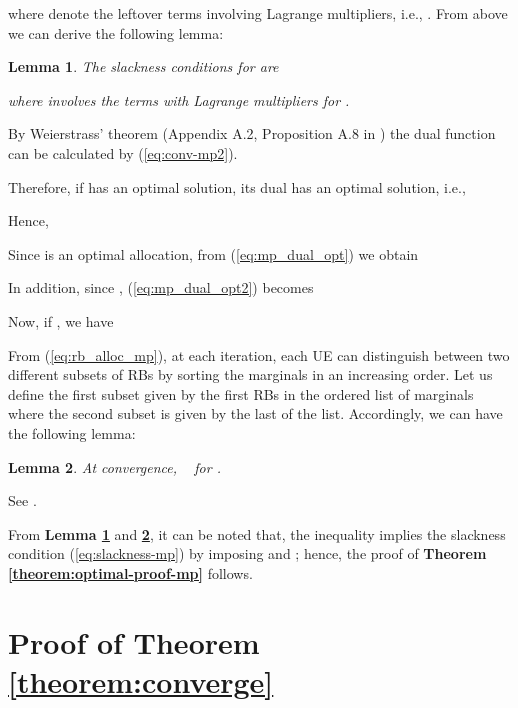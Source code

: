 \documentclass[twocolumn,10pt]{IEEEtran}
\newtheorem{appxlem}{Lemma}[section]
\begin{document}
where  denote the leftover terms involving Lagrange multipliers, i.e., . From above we can derive the following lemma:

\begin{appxlem} \label{lemma:slackness}
The slackness conditions for  are 

where  involves the terms with Lagrange multipliers for .
\end{appxlem}
\begin{IEEEproof}
By Weierstrass' theorem (Appendix A.2, Proposition A.8 in \cite{nonlinear_book_mp}) the dual function can be calculated by (\ref{eq:conv-mp2}).



\begin{figure*}[!t]
\normalsize




\hrulefill
\vspace*{4pt}
\end{figure*}

Therefore, if  has an optimal solution, its dual has an optimal solution, i.e., 

Hence, 

Since  is an optimal allocation, from (\ref{eq:mp_dual_opt}) we obtain

In addition, since , (\ref{eq:mp_dual_opt2}) becomes

Now, if , we have 
\end{IEEEproof}

From (\ref{eq:rb_alloc_mp}), at each iteration, each UE  can distinguish between two different subsets of RBs by sorting the marginals in an increasing order. Let us define  the first subset  given by the first  RBs in the ordered list of marginals where the second subset  is given by the last  of the list. Accordingly, we can have the following lemma:
\begin{appxlem} \label{lemma:con-mp-2}
At convergence,  ~ for .
\end{appxlem}
\begin{IEEEproof}
See \cite{min-sum-mp}. 
\end{IEEEproof}

From  \textbf{Lemma \ref{lemma:slackness}} and \textbf{\ref{lemma:con-mp-2}}, it can be noted that, the inequality  implies the slackness condition (\ref{eq:slackness-mp}) by imposing  and ; hence, the proof of \textbf{Theorem \ref{theorem:optimal-proof-mp}} follows.


\section{Proof of Theorem \ref{theorem:converge}} 
\label{app:converge-mp}
\end{document}
